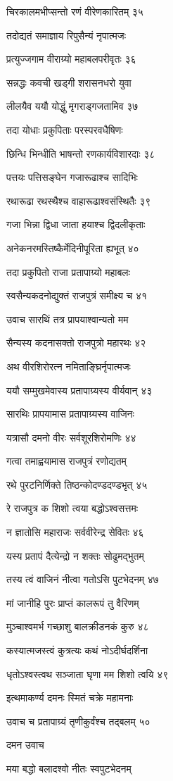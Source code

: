 चिरकालमभीप्सन्तो रणं वीरेणकारितम् ३५

तदोद्यतं समाज्ञाय रिपुसैन्यं नृपात्मजः

प्रत्युज्जगाम वीराग्र्यो महाबलपरीवृतः ३६

सन्नद्धः कवची खड्गी शरासनधरो युवा

लीलयैव ययौ योद्धुं मृगराड्गजतामिव ३७

तदा योधाः प्रकुपिताः परस्परवधैषिणः

छिन्धि भिन्धीति भाषन्तो रणकार्यविशारदाः ३८

पत्तयः पत्तिसङ्घेन गजारूढाश्च सादिभिः

रथारूढा रथस्थैश्च वाहारूढाश्वसंस्थितैः ३९

गजा भिन्ना द्विधा जाता हयाश्च द्विदलीकृताः

अनेकनरमस्तिष्कैर्मेदिनीपूरिता ह्यभूत् ४०

तदा प्रकुपितो राजा प्रतापाग्र्यो महाबलः

स्वसैन्यकदनोद्युक्तं राजपुत्रं समीक्ष्य च ४१

उवाच सारथिं तत्र प्रापयाश्वान्यतो मम

सैन्यस्य कदनासक्तो राजपुत्रो महारथः ४२

अथ वीरशिरोरत्न नमिताङ्घ्रिर्नृपात्मजः

ययौ सम्मुखमेवास्य प्रतापाग्र्यस्य वीर्यवान् ४३

सारथिः प्रापयामास प्रतापाग्र्यस्य वाजिनः

यत्रासौ दमनो वीरः सर्वशूरशिरोमणिः ४४

गत्वा तमाह्वयामास राजपुत्रं रणोद्यतम्

रथे पुरटनिर्णिक्ते तिष्ठन्कोदण्डदण्डभृत् ४५

रे राजपुत्र क शिशो त्वया बद्धोऽश्वसत्तमः

न ज्ञातोसि महाराजः सर्ववीरेन्द्र सेवितः ४६

यस्य प्रतापं दैत्येन्द्रो न शक्तः सोढुमद्भुतम्

तस्य त्वं वाजिनं नीत्वा गतोऽसि पुटभेदनम् ४७

मां जानीहि पुरः प्राप्तं कालरूपं तु वैरिणम्

मुञ्चाश्वमर्भ गच्छाशु बालक्रीडनकं कुरु ४८

कस्यात्मजस्त्वं कुत्रत्यः कथं नोऽदीर्घदर्शिना

धृतोऽश्वस्त्वथ सञ्जाता घृणा मम शिशो त्वयि ४९

इत्थमाकर्ण्य दमनः स्मितं चक्रे महामनाः

उवाच च प्रतापाग्र्यं तृणीकुर्वंश्च तद्बलम् ५०

दमन उवाच

मया बद्धो बलादश्वो नीतः स्वपुटभेदनम्

